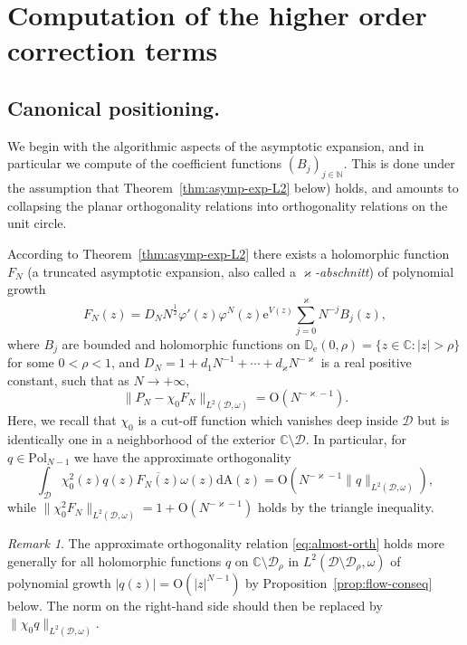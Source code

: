 \documentclass{amsart}
\newcommand{\be}{\begin{equation}}
\newcommand{\ee}{\end{equation}}
\newcommand{\C}{\mathbb{C}}
\newcommand{\D}{\mathbb{D}}
\newcommand{\N}{\mathbb{N}}
\newcommand{\calD}{\mathcal{D}}
\newcommand{\diffA}{\mathrm{dA}}
\theoremstyle{definition}
\theoremstyle{remark}
\newtheorem{rem}[thm]{Remark}
\newcommand{\e}{\mathrm{e}}
\newcommand{\Ordo}{\mathrm{O}}
\numberwithin{equation}{subsection}
\begin{document}
 














\section{Computation of the higher order correction terms}
\subsection{Canonical positioning.}
\label{ss:heuristic-intro}
We begin with the algorithmic aspects of the
asymptotic expansion, and in particular we
compute of the coefficient functions 
$(B_j)_{j\in\N}$.
This is done under the assumption that
Theorem~\ref{thm:asymp-exp-L2} below) holds, 
and amounts to collapsing
the planar orthogonality relations into orthogonality 
relations on the unit circle. 

According to
Theorem~\ref{thm:asymp-exp-L2}
there exists a holomorphic function $F_N$ 
(a truncated asymptotic expansion, also called a $\varkappa${\em-abschnitt}) 
of polynomial growth
\be\label{eq:FN-formula}
F_N(z)=D_NN^\frac12\varphi'(z)\varphi^N(z)
\e^{V(z)}\sum_{j=0}^{\varkappa}N^{-j}B_j(z),
\ee
where $B_j$ are bounded and holomorphic functions 
on $\D_\e(0,\rho)=\{z\in\C:|z|>\rho\}$
for some $0<\rho<1$, and $D_N=1+d_1N^{-1} + \cdots+d_\varkappa N^{-\varkappa}$ is a
real positive constant, 
such that as $N\to+\infty$,
\be
\lVert P_N-\chi_0 F_N\rVert_{L^2(\calD,\omega)}=\Ordo(N^{-\varkappa-1}).
\ee
Here, we recall that $\chi_0$ is a cut-off 
function which vanishes deep inside $\calD$
but is identically one in a neighborhood of 
the exterior $\C\setminus\calD$.
In particular, for $q\in\mathrm{Pol}_{N-1}$ 
we have the approximate orthogonality
\be\label{eq:almost-orth}
\int_\calD \chi_0^2(z)q(z)\overline{F_N(z)}\omega(z)\diffA(z)=
\Ordo(N^{-\varkappa-1}\lVert q\rVert_{L^2(\calD,\omega)}),
\ee
while $\lVert \chi_0^2 F_N\rVert_{L^2(\calD,\omega)}=1+\Ordo(N^{-\varkappa-1})$
holds by the triangle inequality.


\begin{rem}\label{rem:ext-to-qpol}
The approximate orthogonality relation 
\eqref{eq:almost-orth} holds more 
generally for all holomorphic functions 
$q$ on $\C\setminus\calD_\rho$ in 
$L^2(\calD\setminus\calD_\rho,\omega)$
of polynomial growth $|q(z)|=\Ordo(|z|^{N-1})$ 
by Proposition~\ref{prop:flow-conseq} below. 
The norm on the right-hand side should
then be replaced by $\lVert \chi_0 q\rVert_{L^2(\calD,\omega)}$. 
\end{rem}
\end{document}
